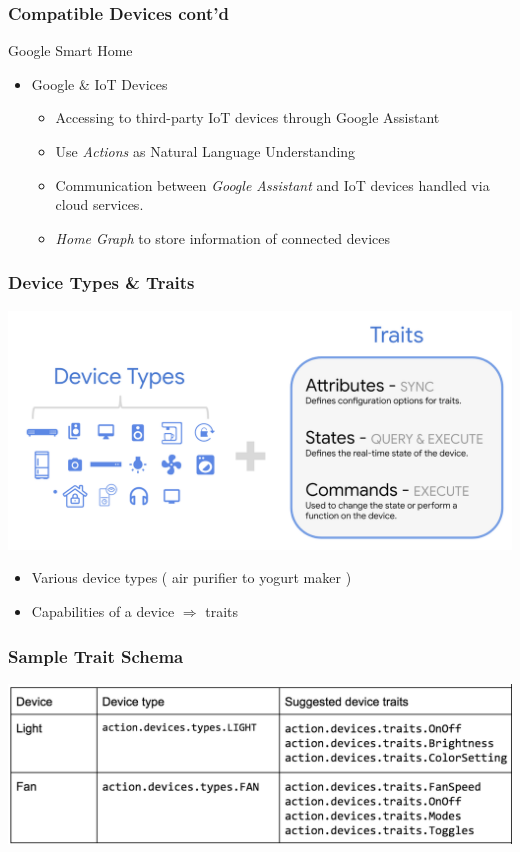 \documentclass{beamer}
\begin{document}
\begin{frame}
\frametitle{Compatible Devices cont'd}
\begin{block}{Google Smart Home}
\begin{itemize}
\item Google \& IoT Devices
\begin{itemize}
\item Accessing to third-party IoT devices through Google Assistant
\item Use \textit{Actions} as Natural Language Understanding
\item Communication between \textit{Google Assistant} and IoT devices handled via cloud services.
\item \textit{Home Graph} to store information of connected devices
\end{itemize}
\end{itemize}
\end{block}
\end{frame}

\begin{frame}
\frametitle{Device Types \& Traits}
\begin{center}
\includegraphics[scale=0.2]{pictures/state_commands.png} 
\end{center}
\begin{itemize}
\item Various device types ( air purifier to yogurt maker )
\item Capabilities of a device $\Rightarrow$ traits
\end{itemize}
\end{frame}

\begin{frame}
\frametitle{Sample Trait Schema}
\begin{center}
\includegraphics[scale=0.25]{pictures/types_and_traits.png} 
\end{center}
\end{frame}
\end{document}
